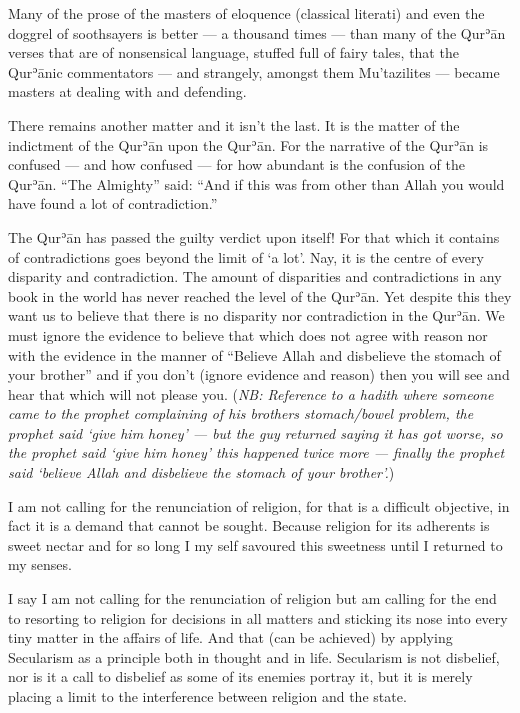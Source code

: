 \documentclass[12pt]{book}
\def \Quran{Qurʾān} %
\def \Qrn{\Quran}   %
\newcommand{\NB}[1]{\emph{\small NB: #1}}
\begin{document}
Many of the prose of the masters of eloquence (classical literati) and even the
doggrel of soothsayers is better — a thousand times — than many of the \Quran
verses that are of nonsensical language, stuffed full of fairy tales, that the
\Quran{}ic commentators — and strangely, amongst them Mu’tazilites — became
masters at dealing with and defending.

There remains another matter and it isn’t the last. It is the matter of the
indictment of the \Qrn{} upon the \Quran. For the narrative of the \Qrn{} is
confused — and how confused — for how abundant is the confusion of the \Quran.
“The Almighty” said: “And if this was from other than Allah you would have
found a lot of contradiction.”

The \Qrn{} has passed the guilty verdict upon itself! For that which it
contains of contradictions goes beyond the limit of ‘a lot’. Nay, it is the
centre of every disparity and contradiction. The amount of disparities and
contradictions in any book in the world has never reached the level of the
\Quran. Yet despite this they want us to believe that there is no disparity nor
contradiction in the \Quran. We must ignore the evidence to believe that which
does not agree with reason nor with the evidence in the manner of “Believe
Allah and disbelieve the stomach of your brother”
and if you don’t (ignore evidence and reason) then you will see and hear that
which will not please you.
(\NB{Reference to a hadith where someone came to the prophet complaining of his
brothers stomach/bowel problem, the prophet said ‘give him honey’ — but the guy
returned saying it has got worse, so the prophet said ‘give him honey’ this
happened twice more — finally the prophet said ‘believe Allah and disbelieve
the stomach of your brother’.})

I am not calling for the renunciation of religion, for that is a difficult
objective, in fact it is a demand that cannot be sought. Because religion for
its adherents is sweet nectar and for so long I my self savoured this sweetness
until I returned to my senses.

I say I am not calling for the renunciation of religion but am calling for the
end to resorting to religion for decisions in all matters and sticking its nose
into every tiny matter in the affairs of life. And that (can be achieved) by
applying Secularism as a principle both in thought and in life. Secularism is
not disbelief, nor is it a call to disbelief as some of its enemies portray
it, but it is merely placing a limit to the interference between religion and
the state.
\end{document}
